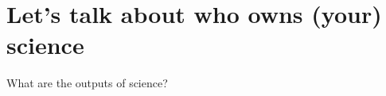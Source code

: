 \section[Who's data is it]{Let's talk about who owns (your) science}
\label{sec:ownership}


\begin{frame}{What are the outputs of science?}


\end{frame}

